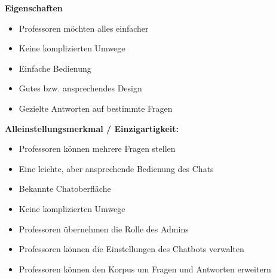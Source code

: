 \textbf{Eigenschaften}
\begin{itemize}
    \item Professoren möchten alles einfacher
    \item Keine komplizierten Umwege
    \item Einfache Bedienung
    \item Gutes bzw. ansprechendes Design
    \item Gezielte Antworten auf bestimmte Fragen
\end{itemize}
\medskip

\textbf{Alleinstellungsmerkmal / Einzigartigkeit:}
\begin{itemize}
    \item Professoren können mehrere Fragen stellen
    \item Eine leichte, aber ansprechende Bedienung des Chats
    \item Bekannte Chatoberfläche
    \item Keine komplizierten Umwege
    \item Professoren übernehmen die Rolle des Admins
    \item Professoren können die Einstellungen des Chatbots verwalten
    \item Professoren können den Korpus um Fragen und Antworten erweitern
\end{itemize}



